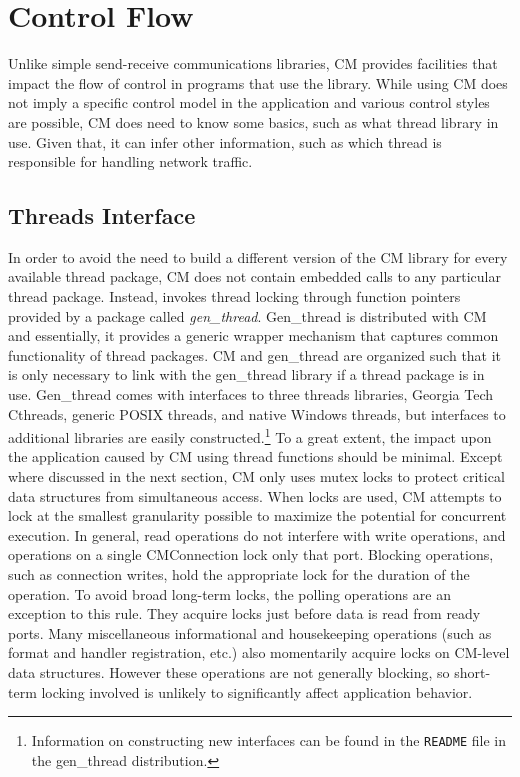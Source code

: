 \documentclass[11pt]{article}
\begin{document}
\section{Control Flow}

\label{sec:controlflow}
Unlike simple send-receive communications libraries, CM provides facilities
that impact the flow of control in programs that use the library.  While
using CM does not imply a specific control model in the application and
various control styles are possible, CM does need to know some basics, such
as what thread library in use.  Given that, it can infer other information,
such as which thread is responsible for handling network traffic.

\subsection{Threads Interface}

In order to avoid the need to build a different version of the CM library
for every available thread package, CM does not contain embedded calls to
any particular thread package.  Instead, invokes thread locking through
function pointers provided by a package called {\it gen\_thread}.
Gen\_thread is distributed with CM and essentially, it provides a generic
wrapper mechanism that captures common functionality of thread packages.  CM
and gen\_thread are organized such that it is only necessary to link with
the gen\_thread library if a thread package is in use.  Gen\_thread comes
with interfaces to three threads libraries, Georgia Tech Cthreads, generic
POSIX threads, and native Windows threads, but interfaces to additional
libraries are easily constructed.\footnote{Information on constructing new
interfaces can be found in the {\tt README} file in the gen\_thread
distribution.}  To a great extent, the impact upon the application caused by
CM using thread functions should be minimal.  Except where discussed in the
next section, CM only uses mutex locks to protect critical data structures
from simultaneous access.  When locks are used, CM attempts to lock at the
smallest granularity possible to maximize the potential for concurrent
execution.  In general, read operations do not interfere with write
operations, and operations on a single CMConnection lock only that port.
Blocking operations, such as connection writes, hold the appropriate lock
for the duration of the operation.  To avoid broad long-term locks, the
polling operations are an exception to this rule.  They acquire locks just
before data is read from ready ports.  Many miscellaneous informational and
housekeeping operations (such as format and handler registration, etc.) also
momentarily acquire locks on CM-level data structures.  However these
operations are not generally blocking, so short-term locking involved is
unlikely to significantly affect application behavior.
\end{document}
